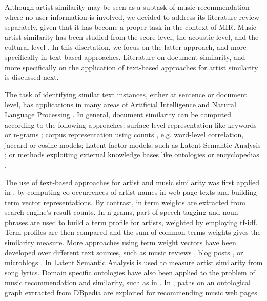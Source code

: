 Although artist similarity may be seen as a subtask of music recommendation where no user information is involved, we decided to address its literature review separately, given that it has become a proper task in the context of MIR.
Music artist similarity has been studied from the score level, the acoustic level, and the cultural level \citep{Ellis2002}. In this disertation, we focus on the latter approach, and more specifically in text-based approaches. Literature on document similarity, and more specifically on the application of text-based approaches for artist similarity is discussed next.

The task of identifying similar text instances, either at sentence or document level, has applications in many areas of Artificial Intelligence and Natural Language Processing \citep{LiuandWang2014}. In general, document similarity can be computed according to the following approaches: surface-level representation like keywords or n-grams \citep{ChimandDeng2008}; corpus representation using counts \citep{Rorvig1999}, e.g. word-level correlation, jaccard or cosine models; Latent factor models, such as Latent Semantic Analysis \citep{Deerwesteretal1990}; or methods exploiting external knowledge bases like ontologies or encyclopedias \citep{Huetal2009}.

The use of text-based approaches for artist and music similarity was first applied in \citep{Cohen2000}, by computing co-occurrences of artist names in web page texts and building term vector representations. By contrast, in \citep{Schedl2005} term weights are extracted from search engine's result counts. In \citep{Whitman2002} n-grams, part-of-speech tagging and noun phrases are used to build a term profile for artists, weighted by employing tf-idf. Term profiles are then compared and the sum of common terms weights gives the similarity measure. %
More approaches using term weight vectors have been developed over different text sources, such as music reviews \citep{Hu2005}, blog posts \citep{Celma2006}, or microblogs \citep{Schedl2013}.
In \citep{Logan2003} Latent Semantic Analysis is used to measure artist similarity from song lyrics. Domain specific ontologies have also been applied to the problem of music recommendation and similarity, such as in \citep{Celma2008}. In \citep{Leal2012}, paths on an ontological graph extracted from DBpedia are exploited for recommending music web pages. %


